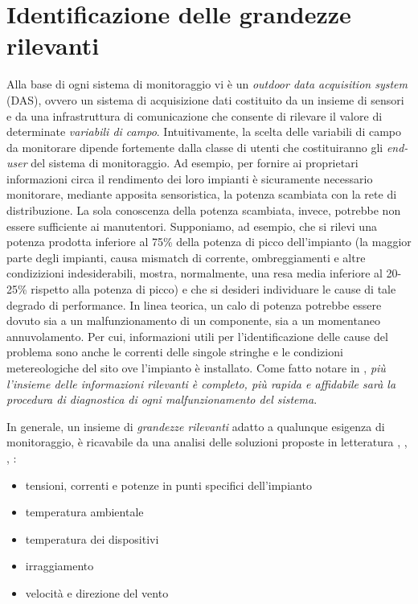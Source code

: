 %
\section{Identificazione delle grandezze rilevanti}
Alla base di ogni sistema di monitoraggio vi \`e un \emph{outdoor data acquisition system} 
(DAS), ovvero un sistema di acquisizione dati costituito da un insieme di sensori 
e da una infrastruttura di comunicazione che consente di rilevare il valore di 
determinate \emph{variabili di campo}. 
Intuitivamente, la scelta delle variabili di campo da monitorare dipende fortemente dalla 
classe di utenti che costituiranno gli \emph{end-user} del sistema di monitoraggio.
%
Ad esempio, per fornire ai proprietari informazioni circa il rendimento dei loro impianti 
\`e sicuramente necessario monitorare, mediante apposita sensoristica, la potenza scambiata 
con la rete di distribuzione. La sola conoscenza della potenza scambiata, invece, potrebbe 
non essere sufficiente ai manutentori.
%
Supponiamo, ad esempio, che si rilevi una potenza prodotta inferiore al 75\% della potenza di picco
dell'impianto (la maggior parte degli impianti, causa mismatch di corrente, ombreggiamenti e 
altre condizizioni indesiderabili, mostra, normalmente, una resa media inferiore al 20-25\% rispetto 
alla potenza di picco\cite{roman06}) e che si desideri individuare le cause di tale degrado 
di performance.
%
In linea teorica, un calo di potenza potrebbe essere dovuto sia a un malfunzionamento 
di un componente, sia a un momentaneo annuvolamento. Per cui, informazioni utili per 
l'identificazione delle cause del problema sono anche le correnti delle singole stringhe e le 
condizioni metereologiche del sito ove l'impianto \`e installato.
%
Come fatto notare in \cite{kolodenny08}, \emph{pi\`u l'insieme delle informazioni rilevanti 
\`e completo, pi\`u rapida e affidabile sar\`a la procedura di diagnostica di ogni 
malfunzionamento del sistema}.
%

%
In generale, un insieme di \emph{grandezze rilevanti} adatto a qualunque esigenza 
di monitoraggio, \`e ricavabile da una analisi delle soluzioni proposte in letteratura
\cite{xiaoli11}, \cite{dirks06}, \cite{kolodenny06}, \cite{aristizabal06}: %
%
\begin{itemize}
\item tensioni, correnti e potenze in punti specifici dell'impianto
\item temperatura ambientale
\item temperatura dei dispositivi
\item irraggiamento
\item velocit\`a e direzione del vento
\end{itemize}
%
%
